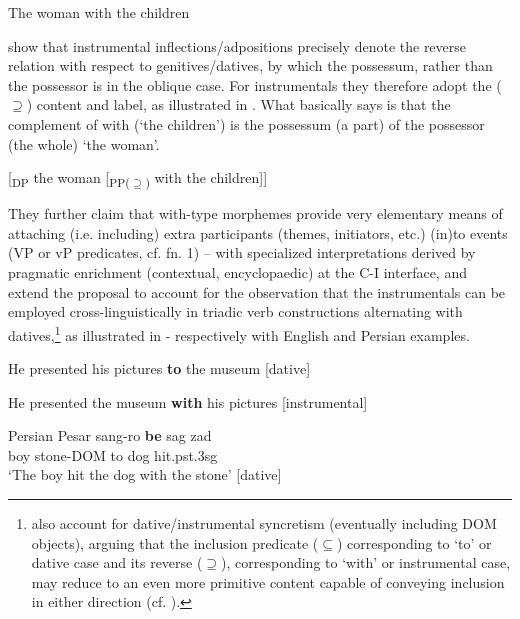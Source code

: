 \documentclass[output=paper,modfonts,nonflat,newtxmath,colorlinks,citecolor=brown]{langsci/langscibook}
\begin{document}
\ea%
    \label{ex:franco:4}
    The woman with the children
    \z

           

\citet{FrancoManzini2017Ins} show that instrumental inflections/adpositions precisely denote the reverse relation with respect to genitives/datives, by which the possessum, rather than the possessor is in the oblique case. For instrumentals they therefore adopt the (${\supseteq}$) content and label, as illustrated in . What  basically says is that the complement of with (‘the children’) is the possessum (a part) of the possessor (the whole) ‘the woman’.

\ea%
    \label{ex:franco:5}
     {[}\textsubscript{DP} the woman [\textsubscript{PP(${\supseteq}$)} with the children]{]}

    \z

          
They further claim that {with}{}-type morphemes provide very elementary means of attaching (i.e. including) extra participants (themes, initiators, etc.) (in)to events (VP or vP predicates, cf. fn. 1) – with specialized interpretations derived by pragmatic enrichment (contextual, encyclopaedic) at the C-I interface, and extend the proposal to account for the observation that the instrumentals can be employed cross-linguistically in triadic verb constructions alternating with datives,\footnote{\citet{FrancoManzini2017Ins} also account for dative/instrumental syncretism (eventually including DOM objects), arguing that the inclusion predicate (\textrm{${\subseteq}$}) corresponding to ‘to’ or dative case and its reverse (\textrm{${\supseteq}$}), corresponding to ‘with’ or instrumental case, may reduce to an even more primitive content capable of conveying inclusion in either direction (cf. ).}  as illustrated in - respectively with English and Persian examples. 

\ea%
    \label{ex:franco:6}
    \ea \label{ex:franco:6a}
    He presented his pictures \textbf{to} the museum \hfill[dative]
    
     \ex \label{ex:franco:6b}
    He presented the museum \textbf{with} his pictures \hfill[instrumental]
    \z
    \z


\ea Persian%
    \label{ex:franco:7}
    \ea  \label{ex:franco:7a}
    \gll  Pesar sang-ro \textbf{be} sag zad  \\
         boy stone-DOM to dog hit.pst.3sg \\
    \glt ‘The boy hit the dog with the stone’ \hfill [dative]
    
\end{document}
